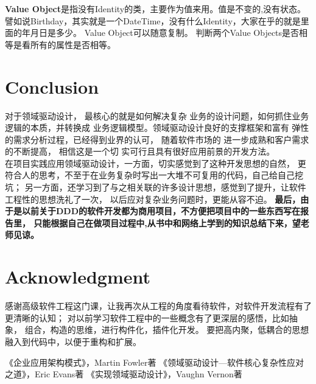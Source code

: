 \documentclass[journal]{IEEEtran}
\begin{document}
\begin{CJK*}{UTF8}{gbsn}
\indent 

{\bfseries Value Object}是指没有Identity的类，主要作为值来用。值是不变的,没有状态。譬如说Birthday，其实就是一个DateTime，没有什么Identity，大家在乎的就是里面的年月日是多少。
Value Object可以随意复制。
判断两个Value Objects是否相等是看所有的属性是否相等。

 




 \section{Conclusion}
对于领域驱动设计， 最核心的就是如何解决复杂
业务的设计问题，如何抓住业务逻辑的本质，并转换成
业务逻辑模型。领域驱动设计良好的支撑框架和富有
弹性的需求分析过程，已经得到业界的认可，  随着软件市场的
进一步成熟和客户需求的不断提高， 相信这是一个切
实可行且具有很好应用前景的开发方法。
\\
\indent
在项目实践应用领域驱动设计，一方面，切实感觉到了这种开发思想的自然，
更符合人的思考，不至于在业务复杂时写出一大堆不可复用的代码，自己给自己挖坑；
另一方面，还学习到了与之相关联的许多设计思想，感觉到了提升，让软件工程性的思想洗礼了一次，
以后应对复杂业务问题时，更能从容不迫。
{\bfseries  最后，由于是以前关于DDD的软件开发都为商用项目，不方便把项目中的一些东西写在报告里，
只能根据自己在做项目过程中,从书中和网络上学到的知识总结下来，望老师见谅。}


 
 


\section*{Acknowledgment}
感谢高级软件工程这门课，让我再次从工程的角度看待软件，对软件开发流程有了更清晰的认知；
对以前学习软件工程中的一些概念有了更深层的感悟，比如抽象，
组合，构造的思维，进行构件化，插件化开发。
要把高内聚，低耦合的思想融入到代码中，以便于重构和扩展。


\ifCLASSOPTIONcaptionsoff
  \newpage
\fi



\begin{thebibliography}{1}
 
 
  《企业应用架构模式》，Martin Fowler著
  《领域驱动设计—软件核心复杂性应对之道》，Eric Evans著 
  《实现领域驱动设计》，Vaughn Vernon著
  
\end{thebibliography}

 
\clearpage
\end{CJK*}
\end{document}
